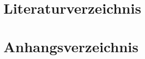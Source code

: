 \documentclass[
pagesize,				%
a4paper,				%
oneside,				%
headsepline,		    %
11pt,					%
halfparskip,		    %
final,					%
listof=totoc           %
]{scrartcl}			    %
\begin{document}






\newpage
\renewcommand{\thesection}{\roman{section}}
\ohead[\pagemark]{}
\setcounter{section}{0}
\newpage
\section{Literaturverzeichnis}
\label{sec:literaturverzeichnis}
\printbibliography
\newpage
\section{Anhangsverzeichnis}
\label{sec:anhangsverzeichnis}
\newpage

\end{document}
